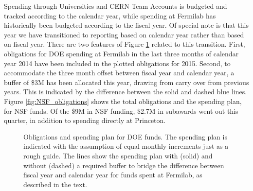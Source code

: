 Spending through Universities and CERN Team Accounts is budgeted and tracked according
to the calendar year, while spending at Fermilab has historically been budgeted according
to the fiscal year.  Of special note is that this year we have transitioned to
reporting based on calendar year rather than based on fiscal year.  There are two features
of Figure \ref{fig:DOE_obligations} related to this transition.
First, obligations for DOE spending at Fermilab in the last three months of calendar year 2014
have been included in the plotted obligations for 2015.  Second, to accommodate the three month
offset between fiscal year and calendar year, a buffer of \$3M has been allocated this year,
drawing from carry over from previous years.  This is indicated by the difference between
the solid and dashed blue lines.  Figure \ref{fig:NSF_obligations} shows the total obligations
and the spending plan, for NSF funds.  Of the \$9M in NSF funding, \$2.7M in subawards went out
this quarter, in addition to spending directly at Princeton.

\begin{figure}[hbtp]
  \begin{center}
    \caption{Obligations and spending plan for DOE funds.  The spending plan
is indicated with the assumption of equal monthly increments just as a rough guide.
The lines show the spending plan with (solid) and without (dashed) a required
buffer to bridge the difference between fiscal year and calendar year for
funds spent at Fermilab, as described in the text.}
    \label{fig:DOE_obligations}
  \end{center}
\end{figure}

